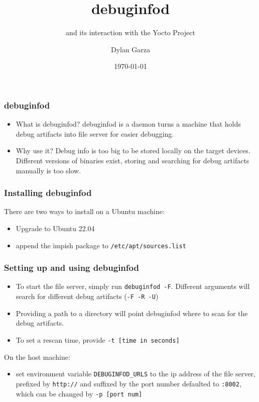 \documentclass[10pt]{beamer}
\title{debuginfod}
\subtitle{and its interaction with the 
Yocto Project}
\author{Dylan Garza}
\date{\today}
\begin{document}
\frame{\titlepage}

\begin{frame}
   \frametitle{debuginfod}
   \vspace{-1cm}
   \begin{itemize}
      \item What is debuginfod?
      debuginfod is a daemon turns a machine that
      holds debug artifacts into file server for
      easier debugging. \\
      \vspace{.5cm}
      \item Why use it?
      Debug info is too big to be stored locally
      on the target devices. Different versions 
      of binaries exist, storing and searching 
      for debug artifacts manually is too slow.
   \end{itemize}
\end{frame}

\begin{frame}[fragile]
   \frametitle{Installing debuginfod}
   \vspace{-1cm}
   \noindent
   There are two ways to install on a Ubuntu machine:
   \begin{itemize}
      \item Upgrade to Ubuntu 22.04
      \item append the impish package to \verb|/etc/apt/sources.list|
   \end{itemize}
\end{frame}

\begin{frame}[fragile]
   \frametitle{Setting up and using debuginfod}
   \vspace{-1cm}
   \begin{itemize}
      \item To start the file server, simply run \verb|debuginfod -F|. 
         Different arguments will search for different debug artifacts (\verb|-F -R -U|)
      \item Providing a path to a directory will point debuginfod where to scan for the debug artifacts.
      \item To set a rescan time, provide \verb|-t [time in seconds]|
   \end{itemize}
   On the host machine:
   \begin{itemize}
      \item set environment variable \verb|DEBUGINFOD_URLS| to the ip address 
         of the file server, prefixed by \verb|http://| and suffixed by the 
         port number defaulted to \verb|:8002|, which can be changed by \verb|-p [port num]|
   \end{itemize}
\end{frame}
\end{document}
